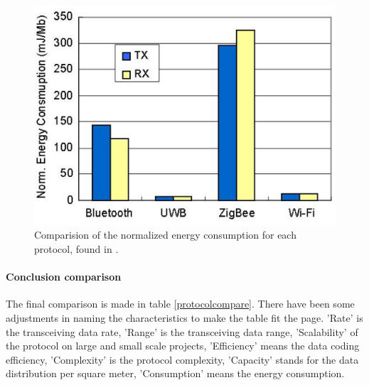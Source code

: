 \documentclass[10pt,a4paper]{article}
\begin{document}
\begin{figure}[H]
   \centering
   \includegraphics[width=1\textwidth]{images/protocolenergynormalized.png}
   \caption{Comparision of the normalized energy consumption for each protocol, found in \cite{comparitivestudywirelessprotocols}.}
   \label{fig:protocolenergynormalized}
\end{figure}


\paragraph{Conclusion comparison}
The final comparison is made in table \ref{protocolcompare}. There have been some adjustments in naming the characteristics to make the table fit the page. 'Rate' is the transceiving data rate, 'Range' is the transceiving data range, 'Scalability' of the protocol on large and small scale projects, 'Efficiency' means the data coding efficiency, 'Complexity' is the protocol complexity, 'Capacity' stands for the data distribution per square meter, 'Consumption' means the energy consumption.
\end{document}
